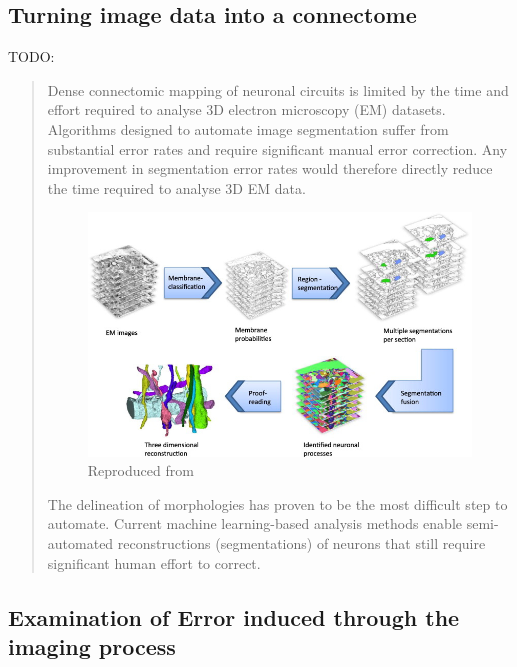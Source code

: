 \subsection{Turning image data into a connectome}
TODO:
\begin{quote}
    Dense connectomic mapping of neuronal circuits is limited by the time and
    effort required to analyse 3D electron microscopy (EM) datasets. Algorithms
    designed to automate image segmentation suffer from substantial error rates
    and require significant manual error correction. Any improvement in
    segmentation error rates would therefore directly reduce the time required
    to analyse 3D EM data.
    \autocite{pallotto_extracellular_2015} \autocite{tomsett_virtual_2015}

    \begin{figure}[h]
        \centering
        \includegraphics[scale=0.75]{figures/images/reconstruction.jpg}
        {Reproduced from \cite{kaynig_large-scale_2015}}
        \label{reconstruction}
    \end{figure}
    \vspace{1ex}

    The delineation of morphologies has proven to be the most difficult step to
    automate. Current machine learning-based analysis methods enable
    semi-automated reconstructions (segmentations) of neurons that still require
    significant human effort to correct.
    \autocite{helmstaedter_connectomic_2013}
\end{quote}

\subsection[Error induced through noise]{Examination of Error induced through the imaging process}

